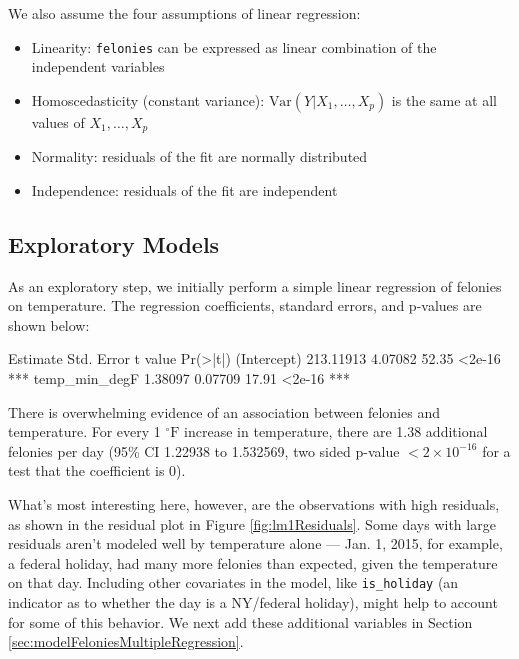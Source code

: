 \documentclass[11pt,notitlepage]{article}
\newenvironment{codeSmall}%
   {\par\noindent\adjustbox{margin=1ex,bgcolor=shadecolor,margin=0ex \medskipamount}\bgroup\minipage\linewidth\verbatim\footnotesize}%
   {\endverbatim\endminipage\egroup}
\newcommand{\degf}{^\circ\text{F}}
\begin{document}
We also assume the four assumptions of linear regression:
\begin{itemize}
\setlength\itemsep{-1pt}

\item Linearity: \texttt{felonies} can be expressed as linear combination of the independent variables
\item Homoscedasticity (constant variance): $\text{Var}(Y|X_1,\ldots, X_p)$ is the same at all values of $X_1,\ldots, X_p$
\item Normality: residuals of the fit are normally distributed
\item Independence: residuals of the fit are independent
\end{itemize}


\subsection{Exploratory Models}

As an exploratory step, we initially perform a simple linear regression of felonies on temperature. The regression coefficients, standard errors, and p-values are shown below: 

\begin{codeSmall}
               Estimate Std. Error t value Pr(>|t|)    
(Intercept)   213.11913    4.07082   52.35   <2e-16 ***
temp_min_degF   1.38097    0.07709   17.91   <2e-16 ***
\end{codeSmall}


There is overwhelming evidence of an association between felonies and temperature. For every 1 $\degf$ increase in temperature, there are 1.38 additional felonies per day (95\% CI 1.22938 to 1.532569, two sided p-value $<2\times10^{-16}$ for a test that the coefficient is 0).

What's most interesting here, however, are the observations with high residuals, as shown in the residual plot in Figure \ref{fig:lm1Residuals}. Some days with large residuals aren't modeled well by temperature alone --- Jan. 1, 2015, for example, a federal holiday, had many more felonies than expected, given the temperature on that day. Including other covariates in the model, like \texttt{is_holiday} (an indicator as to whether the day is a NY/federal holiday), might help to account for some of this behavior. We next add these additional variables in Section \ref{sec:modelFeloniesMultipleRegression}.
\end{document}
